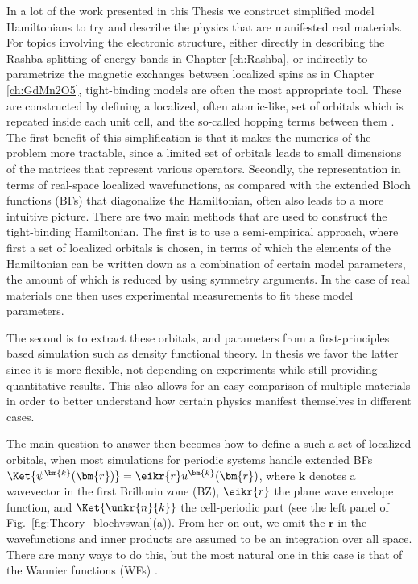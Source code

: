 In a lot of the work presented in this Thesis we construct simplified model Hamiltonians to try and describe the physics that are manifested real materials.
For topics involving the electronic structure, either directly in describing the Rashba-splitting of energy bands in Chapter \ref{ch:Rashba}, or indirectly to parametrize the magnetic exchanges between localized spins as in Chapter \ref{ch:GdMn2O5}, tight-binding models are often the most appropriate tool.
These are constructed by defining a localized, often atomic-like, set of orbitals which is repeated inside each unit cell, and the so-called hopping terms between them \cite{Slater1954}.
The first benefit of this simplification is that it makes the numerics of the problem more tractable, since a limited set of orbitals leads to small dimensions of the matrices that represent various operators.
Secondly, the representation in terms of real-space localized wavefunctions, as compared with the extended Bloch functions (BFs) that diagonalize the Hamiltonian, often also leads to a more intuitive picture.
There are two main methods that are used to construct the tight-binding Hamiltonian.
The first is to use a semi-empirical approach, where first a set of localized orbitals is chosen, in terms of which the elements of the Hamiltonian can be written down as a combination of certain model parameters, the amount of which is reduced by using symmetry arguments.
In the case of real materials one then uses experimental measurements to fit these model parameters.

The second is to extract these orbitals, and parameters from a first-principles based simulation such as density functional theory.
In thesis we favor the latter since it is more flexible, not depending on experiments while still providing quantitative results.
This also allows for an easy comparison of multiple materials in order to better understand how certain physics manifest themselves in different cases. 

The main question to answer then becomes how to define a such a set of localized orbitals, when most simulations for periodic systems handle extended BFs $\Ket{\psi^{\bm{k}}(\bm{r})} = \eikr{r} u^{\bm{k}}(\bm{r})$, where $\bm{k}$ denotes a wavevector in the first Brillouin zone (BZ), $\eikr{r}$ the plane wave envelope function, and $\Ket{\unkr{n}{k}}$ the cell-periodic part (see the left panel of Fig.~\ref{fig:Theory_blochvswan}(a)).
From her on out, we omit the $\bm{r}$ in the wavefunctions and inner products are assumed to be an integration over all space.
There are many ways to do this, but the most natural one in this case is that of the Wannier functions (WFs) \cite{Wannier1937}.

